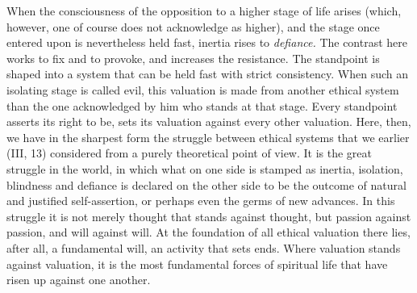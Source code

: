 \documentclass[12pt,a4paper,openany]{book}
\begin{document}
When the consciousness of the opposition to a higher stage of life arises (which, however, one of course
does not acknowledge as higher), and the stage once entered upon is nevertheless held fast, inertia rises
to \textit{defiance.} The contrast here works to fix and to provoke, and increases the resistance. The
standpoint is shaped into a system that can be held fast with strict consistency. When such an isolating
stage is called evil, this valuation is made from another ethical system than the one acknowledged by him
who stands at that stage. Every standpoint asserts its right to be, sets its valuation against every other
valuation. Here, then, we have in the sharpest form the struggle between ethical systems that we earlier
(III, 13) considered from a purely theoretical point of view. It is the great struggle in the world, in
which what on one side is stamped as inertia, isolation, blindness and defiance is declared on the other
side to be the outcome of natural and justified self-assertion, or perhaps even the germs of new advances.
In this struggle it is not merely thought that stands against thought, but passion against passion, and
will against will. At the foundation of all ethical valuation there lies, after all, a fundamental will,
an activity that sets ends. Where valuation stands against valuation, it is the most fundamental forces of
spiritual life that have risen up against one another.
\end{document}
